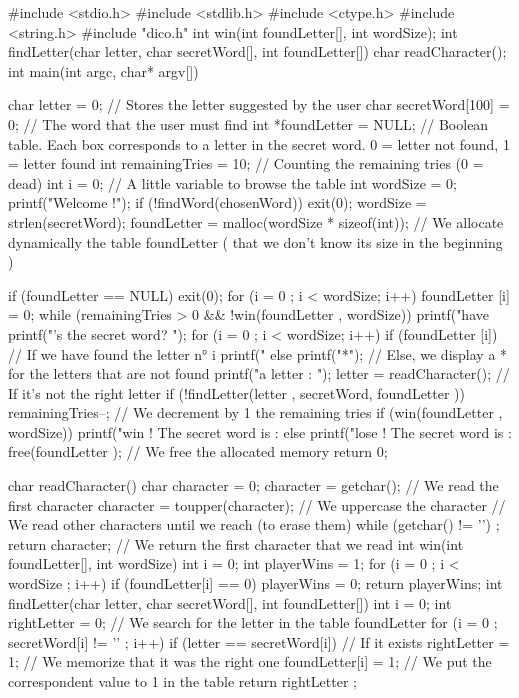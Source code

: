 \begin{Csource}
#include <stdio.h>
#include <stdlib.h>
#include <ctype.h>
#include <string.h>
#include "dico.h"
int win(int foundLetter[], int wordSize);
int findLetter(char letter, char secretWord[], int foundLetter[])
char readCharacter();
int main(int argc, char* argv[])
{
 	char letter = 0; // Stores the letter suggested by the user
 	char secretWord[100] = {0}; // The word that the user must find
 	int *foundLetter = NULL; // Boolean table. Each box corresponds to a letter in the secret word. 0 = letter not found, 1 = letter found
 	int remainingTries = 10; // Counting the remaining tries  (0 = dead)
 	int i = 0; // A little variable to browse the table
 	int wordSize = 0;
 	printf("Welcome !\n\n");
 	if (!findWord(chosenWord))
 	 	exit(0);
 	wordSize = strlen(secretWord);
 	foundLetter = malloc(wordSize  * sizeof(int)); // We allocate dynamically the table foundLetter ( that we don't know its size in the beginning )

 	if (foundLetter  == NULL)
		 exit(0);
 	for (i = 0 ; i < wordSize; i++)
    		 foundLetter [i] = 0;
 	while (remainingTries > 0 && !win(foundLetter , wordSize))
 	{
     		printf("\n\nYou have %
     		printf("\nWhat’s the secret word? ");
     		for (i = 0 ; i < wordSize; i++)
     		{
         			if (foundLetter [i]) // If we have found the letter n° i
 		      		printf("%
 		        	else
 		            	printf("*"); // Else, we display a * for the letters that are not found
     		}
    		 printf("\nSuggest a letter : ");
 	    	letter = readCharacter();
 	    	// If it's not the right letter
 	    	if (!findLetter(letter , secretWord, foundLetter ))
 	    	{
		        	 remainingTries--; // We decrement by 1 the remaining tries
     		}
 	}
 	if (win(foundLetter , wordSize))
 	    	printf("\n\nYou win ! The secret word is : %
 	else
 	    	printf("\n\nTou lose ! The secret word is : %
 	free(foundLetter ); // We free the allocated memory
     	return 0;
}
char readCharacter()
{
 	char character = 0;
 	character = getchar(); // We read the first character
 	character = toupper(character); // We uppercase the character
 	// We read other characters until we reach \n (to erase them)
 	while (getchar() != '\n') ;
 	return character; // We return the first character that we read
}
int win(int foundLetter[], int wordSize)
{
 	int i = 0;
 	int playerWins = 1;
 	for (i = 0 ; i < wordSize ; i++)
 	{
     		if (foundLetter[i] == 0)
         			playerWins = 0;
 	}
 	return playerWins;
}
int findLetter(char letter, char secretWord[], int foundLetter[])
{
 	int i = 0;
 	int rightLetter = 0;
 	// We search for the letter in the table foundLetter
 	for (i = 0 ; secretWord[i] != '\0' ; i++)
 	{
     		if (letter == secretWord[i]) // If it exists
     		{
         			rightLetter = 1; // We memorize that it was the right one
        			 foundLetter[i] = 1; // We put the correspondent value to 1 in the table
     		}
 	}
 	return rightLetter ;
}
\end{Csource}

